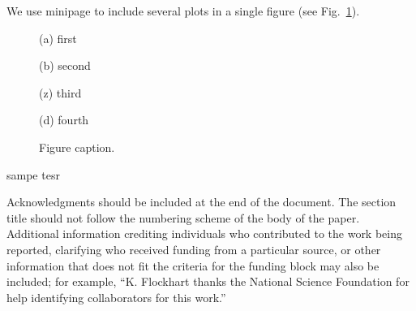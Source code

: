 \documentclass[10pt]{article}
\begin{document}
We use minipage to include several plots in a single figure (see Fig.~\ref{potentialZConstGapedCircularSEFig}).

\begin{figure}[h]

	\begin{minipage}[b]{0.24\linewidth}

		
		\caption*{(a) first}

	\end{minipage}
	\begin{minipage}[b]{0.24\linewidth}

		
		\caption*{(b) second}

	\end{minipage}
	\begin{minipage}[b]{0.24\linewidth}
		
		\caption*{(z) third}

	\end{minipage}
	\begin{minipage}[b]{0.24\linewidth}
		
		\caption*{(d) fourth}

	\end{minipage}


	\caption[Potential.]{Figure caption. }

	\label{potentialZConstGapedCircularSEFig}

\end{figure}


sampe tesr

Acknowledgments should be included at the end of the document. The section title should not follow the numbering scheme of the body of the paper. Additional information crediting individuals who contributed to the work being reported, clarifying who received funding from a particular source, or other information that does not fit the criteria for the funding block may also be included; for example, ``K. Flockhart thanks the National Science Foundation for help identifying collaborators for this work.''
\end{document}
